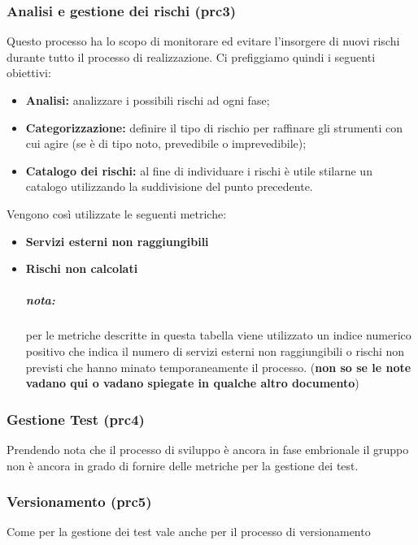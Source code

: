 \subsubsection{Analisi e gestione dei rischi (prc3)}
Questo processo ha lo scopo di monitorare ed evitare l'insorgere di nuovi rischi durante tutto il processo di realizzazione. Ci prefiggiamo quindi i seguenti obiettivi:
\begin{itemize}
	\item{\textbf{Analisi:} analizzare i possibili rischi ad ogni fase;}
	\item{\textbf{Categorizzazione:}  definire il tipo di rischio per raffinare gli strumenti con cui agire (se è di tipo noto, prevedibile o imprevedibile);}
	\item{\textbf{Catalogo dei rischi:} al fine di individuare i rischi è utile stilarne un catalogo utilizzando la suddivisione del punto precedente.}
\end{itemize}
Vengono così utilizzate le seguenti metriche: 
\begin{itemize}
	\item{\textbf{Servizi esterni non raggiungibili}}
	\item{\textbf{Rischi non calcolati}}
	\subparagraph{nota:} per le metriche descritte in questa tabella viene utilizzato un indice numerico positivo che indica il numero di servizi esterni non raggiungibili o rischi non previsti che hanno minato temporaneamente il processo. (\textbf{non so se le note vadano qui o vadano spiegate in qualche altro documento})
\end{itemize}
\begin{table}[!htbp]
	\centering
	\renewcommand{\arraystretch}{2} 
	\caption{TBD}
\end{table}
\newpage
\subsubsection{Gestione Test (prc4)}
Prendendo nota che il processo di sviluppo è ancora in fase embrionale il gruppo non è ancora in grado di fornire delle metriche per la gestione dei test.
\subsubsection{Versionamento (prc5)}
Come per la gestione dei test vale anche per il processo di versionamento
